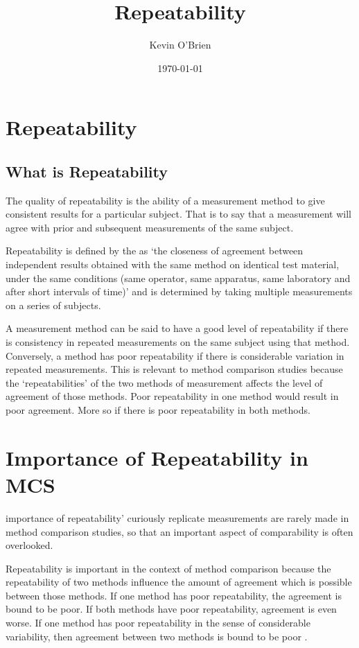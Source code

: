 \documentclass[12pt, a4paper]{article}
\begin{document}
	\author{Kevin O'Brien}
	\title{Repeatability}
	\date{\today}
	\maketitle
\tableofcontents
\section{Repeatability}
\subsection{What is Repeatability}
The quality of repeatability is the ability of a measurement method to give consistent results for a particular subject. That is to say that a measurement will agree with prior and subsequent measurements of the same subject.


Repeatability is defined by the \citet{IUPAC} as `the closeness of agreement between independent results obtained with the same method on identical test material, under the same conditions (same
operator, same apparatus, same laboratory and after short intervals of time)'  and is determined by taking multiple measurements on a series of subjects.

A measurement method can be said to have a good level of repeatability if there is consistency in repeated measurements on the same subject using that method. Conversely, a method has poor repeatability if there is considerable variation in repeated measurements.
This is relevant to method comparison studies because the `repeatabilities' of the two methods of measurement affects the level of agreement of those methods. Poor repeatability in one method would result in poor agreement. More so if there is poor repeatability in both methods.

	

\section{Importance of Repeatability in MCS}
importance of repeatability' curiously replicate measurements are rarely made in method comparison studies, so that an important aspect of comparability is often overlooked.

Repeatability is important in the context of method comparison because the repeatability of two methods influence the amount of agreement which is possible between those methods. If one method has poor repeatability, the agreement is bound to be poor. If both methods have poor repeatability, agreement is even worse. If one method has poor repeatability in the sense of considerable variability, then agreement between two methods is bound to be poor \citep{ARoy2009}.
\end{document}
